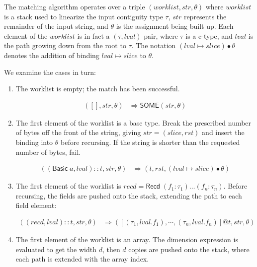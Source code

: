 \documentclass[svgnames]{llncs}
\newcommand{\konst}[1]{\ensuremath{\mathsf{#1}}}
\newcommand{\lval}{\ensuremath{\mathit{lval}}}
\begin{document}
\begin{definition}

The matching algorithm operates over a triple $(\mathit{worklist},
\mathit{str}, \theta)$ where $\mathit{worklist}$ is a stack used to
linearize the input contiguity type $\tau$, $\mathit{str}$ represents
the remainder of the input string, and $\theta$ is the assignment
being built up. Each element of the $\mathit{worklist}$ is in fact a
$(\tau,\mathit{lval})$ pair, where $\tau$ is a c-type, and
$\mathit{lval}$ is the path growing down from the root to $\tau$. The
notation $(\lval \mapsto \mathit{slice}) \bullet \theta$ denotes the
addition of binding $\lval \mapsto \mathit{slice}$ to $\theta$.

We examine the cases in turn:

\begin{enumerate}

\item The worklist is empty; the match has been successful.

\begin{align*}
([], \mathit{str}, \theta) &\Rightarrow \konst{SOME}(\mathit{str}, \theta)
\end{align*}


\item The first element of the worklist is a base type. Break the
  prescribed number of bytes off the front of the string, giving
  $\mathit{str} = (\mathit{slice},\mathit{rst})$ and insert the
  binding into $\theta$ before recursing. If the string is shorter
  than the requested number of bytes, fail.

\begin{align*}
((\konst{Basic}\;a, \lval)::t, \mathit{str}, \theta)
   &\Rightarrow
  (t,\mathit{rst}, (\lval \mapsto \mathit{slice}) \bullet \theta)
\end{align*}

\item The first element of the worklist is $\mathit{recd} =
  \konst{Recd}\;(f_1 : \tau_1) \ldots (f_n : \tau_n)$. Before
  recursing, the fields are pushed onto the stack, extending the path
  to each field element:

\begin{align*}
((\mathit{recd}, \lval)::t, \mathit{str}, \theta)
   &\Rightarrow
  ([(\tau_1,\lval.f_1), \cdots , (\tau_n,\lval.f_n)] @ t,\mathit{str}, \theta)
\end{align*}

\item The first element of the worklist is an array. The dimension
  expression is evaluated to get the width $d$, then $d$ copies are
  pushed onto the stack, where each path is extended with the array
  index.


\end{enumerate}
\end{definition}
\end{document}
